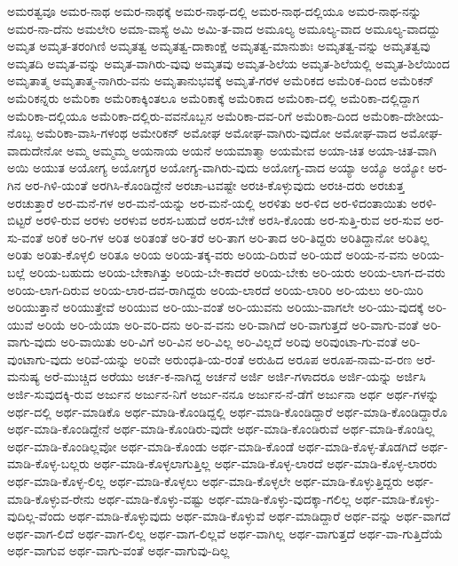 {ಅಮರತ್ವವೂ
ಅಮರ-ನಾಥ
ಅಮರ-ನಾಥಕ್ಕೆ
ಅಮರ-ನಾಥ-ದಲ್ಲಿ
ಅಮರ-ನಾಥ-ದಲ್ಲಿಯೂ
ಅಮರ-ನಾಥ-ನನ್ನು
ಅಮರ-ನಾ-ದೆನು
ಅಮಲೇರಿ
ಅಮಾ-ವಾಸ್ಯೆ
ಅಮಿ
ಅಮಿ-ತ-ವಾದ
ಅಮೂಲ್ಯ
ಅಮೂಲ್ಯ-ವಾದ
ಅಮೂಲ್ಯ-ವಾದದ್ದು
ಅಮೃತ
ಅಮೃತ-ತರಂಗಿಣಿ
ಅಮೃತತ್ವ
ಅಮೃತತ್ವ-ದಾಕಾಂಕ್ಷೆ
ಅಮೃತತ್ವ-ಮಾನುಶುಃ
ಅಮೃತತ್ವ-ವನ್ನು
ಅಮೃತತ್ವವು
ಅಮೃತದಿ
ಅಮೃತ-ವನ್ನು
ಅಮೃತ-ವಾಗಿರು-ವುವು
ಅಮೃತವು
ಅಮೃತ-ಶಿಲೆಯ
ಅಮೃತ-ಶಿಲೆಯಲ್ಲಿ
ಅಮೃತ-ಶಿಲೆಯಿಂದ
ಅಮೃತಾತ್ಮ
ಅಮೃತಾತ್ಮ-ನಾಗಿರು-ವನು
ಅಮೃತಾನುಭವಕ್ಕೆ
ಅಮೃತೆ-ಗರಳ
ಅಮೆರಿಕದ
ಅಮೆರಿಕ-ದಿಂದ
ಅಮೆರಿಕನ್
ಅಮೆರಿಕನ್ನರು
ಅಮೆರಿಕಾ
ಅಮೆರಿಕಾಕ್ಕಿಂತಲೂ
ಅಮೆರಿಕಾಕ್ಕೆ
ಅಮೆರಿಕಾದ
ಅಮೆರಿಕಾ-ದಲ್ಲಿ
ಅಮೆರಿಕಾ-ದಲ್ಲಿದ್ದಾಗ
ಅಮೆರಿಕಾ-ದಲ್ಲಿಯೂ
ಅಮೆರಿಕಾ-ದಲ್ಲಿರು-ವವನೊಬ್ಬನ
ಅಮೆರಿಕಾ-ದವ-ರಿಗೆ
ಅಮೆರಿಕಾ-ದಿಂದ
ಅಮೆರಿಕಾ-ದೇಶೀಯ-ನೊಬ್ಬ
ಅಮೆರಿಕಾ-ವಾಸಿ-ಗಳಂಥ
ಅಮೇರಿಕನ್
ಅಮೋಘ
ಅಮೋಘ-ವಾಗಿರು-ವುದೋ
ಅಮೋಘ-ವಾದ
ಅಮೋಘ-ವಾದುದೇನೋ
ಅಮ್ಮ
ಅಮ್ಮಮ್ಮ
ಅಯನಾಯ
ಅಯನೆ
ಅಯಮಾತ್ಮಾ
ಅಯಮೇವ
ಅಯಾ-ಚಿತ
ಅಯಾ-ಚಿತ-ವಾಗಿ
ಅಯಿ
ಅಯುತ
ಅಯೋಗ್ಯ
ಅಯೋಗ್ಯರ
ಅಯೋಗ್ಯ-ವಾಗಿರು-ವುದು
ಅಯೋಗ್ಯ-ವಾದ
ಅಯ್ಯಾ
ಅಯ್ಯೊ
ಅಯ್ಯೋ
ಅರ-ಗಿನ
ಅರ-ಗಿಳಿ-ಯಂತೆ
ಅರಗಿಸಿ-ಕೊಂಡಿದ್ದೇನೆ
ಅರಚಾ-ಟವಷ್ಟೇ
ಅರಚಿ-ಕೊಳ್ಳುವುದು
ಅರಚಿ-ದರು
ಅರಚುತ್ತ
ಅರಚುತ್ತಾರೆ
ಅರ-ಮನೆ-ಗಳ
ಅರ-ಮನೆ-ಯನ್ನು
ಅರ-ಮನೆ-ಯಲ್ಲಿ
ಅರಳಿತು
ಅರ-ಳಿದ
ಅರ-ಳಿದಂತಾಯಿತು
ಅರಳಿ-ಬಿಟ್ಟರೆ
ಅರಳಿ-ರುವ
ಅರಳು
ಅರಳುವ
ಅರಸ-ಬಹುದೆ
ಅರಸ-ಬೇಕೆ
ಅರಸಿ-ಕೊಂಡು
ಅರ-ಸುತ್ತಿ-ರುವ
ಅರ-ಸುವ
ಅರ-ಸು-ವಂತೆ
ಅರಿಕೆ
ಅರಿ-ಗಳ
ಅರಿತ
ಅರಿತಂತೆ
ಅರಿ-ತರೆ
ಅರಿ-ತಾಗ
ಅರಿ-ತಾದ
ಅರಿ-ತಿದ್ದರು
ಅರಿತಿದ್ದಾನೋ
ಅರಿತಿಲ್ಲ
ಅರಿತು
ಅರಿತು-ಕೊಳ್ಳಲಿ
ಅರಿತೂ
ಅರಿಯ
ಅರಿಯ-ತಕ್ಕ-ವರು
ಅರಿಯ-ದಿರುವೆ
ಅರಿ-ಯದೆ
ಅರಿಯ-ನ-ವನು
ಅರಿಯ-ಬಲ್ಲೆ
ಅರಿಯ-ಬಹುದು
ಅರಿಯ-ಬೇಕಾಗಿತ್ತು
ಅರಿಯ-ಬೇ-ಕಾದರೆ
ಅರಿಯ-ಬೇಕು
ಅರಿ-ಯರು
ಅರಿಯ-ಲಾಗ-ದ-ವರು
ಅರಿಯ-ಲಾಗ-ದಿರುವ
ಅರಿಯ-ಲಾರ-ದವ-ರಾಗಿದ್ದರು
ಅರಿಯ-ಲಾರದೆ
ಅರಿಯ-ಲಾರಿರಿ
ಅರಿ-ಯಲು
ಅರಿ-ಯಿರಿ
ಅರಿಯುತ್ತಾನೆ
ಅರಿಯುತ್ತೇವೆ
ಅರಿಯುವ
ಅರಿ-ಯು-ವಂತೆ
ಅರಿ-ಯುವನು
ಅರಿಯು-ವಾಗಲೇ
ಅರಿ-ಯು-ವುದಕ್ಕೆ
ಅರಿ-ಯುವೆ
ಅರಿಯೆ
ಅರಿ-ಯೆಯಾ
ಅರಿ-ವರಿ-ದನು
ಅರಿ-ವ-ವನು
ಅರಿ-ವಾಗಿದೆ
ಅರಿ-ವಾಗುತ್ತದೆ
ಅರಿ-ವಾಗು-ವಂತೆ
ಅರಿ-ವಾಗು-ವುದು
ಅರಿ-ವಾಯಿತು
ಅರಿ-ವಿಗೆ
ಅರಿ-ವಿನ
ಅರಿ-ವಿಲ್ಲ
ಅರಿ-ವಿಲ್ಲದೆ
ಅರಿವು
ಅರಿವುಂಟಾ-ಗು-ವಂತೆ
ಅರಿ-ವುಂಟಾಗು-ವುದು
ಅರಿವೆ-ಯನ್ನು
ಅರಿವೇ
ಅರುಂಧತಿ-ಯ-ರಂತೆ
ಅರುಹಿದ
ಅರೂಪ
ಅರೂಪ-ನಾಮ-ವ-ರಣ
ಅರೆ-ಮನುಷ್ಯ
ಅರೆ-ಮುಚ್ಚಿದ
ಅರೆಯು
ಅರ್ಚ-ಕ-ನಾಗಿದ್ದ
ಅರ್ಚನೆ
ಅರ್ಜಿ
ಅರ್ಜಿ-ಗಳಾದರೂ
ಅರ್ಜಿ-ಯನ್ನು
ಅರ್ಜಿಸಿ
ಅರ್ಜಿ-ಸುವುದಕ್ಕಿ-ರುವ
ಅರ್ಜುನ
ಅರ್ಜುನ-ನಿಗೆ
ಅರ್ಜು-ನನೂ
ಅರ್ಜುನ-ನೆ-ಡೆಗೆ
ಅರ್ಜುನಾ
ಅರ್ಥ
ಅರ್ಥ-ಗಳನ್ನು
ಅರ್ಥ-ದಲ್ಲಿ
ಅರ್ಥ-ಮಾಡಿಕೊ
ಅರ್ಥ-ಮಾಡಿ-ಕೊಂಡಿದ್ದಲ್ಲಿ
ಅರ್ಥ-ಮಾಡಿ-ಕೊಂಡಿದ್ದಾರೆ
ಅರ್ಥ-ಮಾಡಿ-ಕೊಂಡಿದ್ದಾರೊ
ಅರ್ಥ-ಮಾಡಿ-ಕೊಂಡಿದ್ದೇನೆ
ಅರ್ಥ-ಮಾಡಿ-ಕೊಂಡಿರು-ವುದೇ
ಅರ್ಥ-ಮಾಡಿ-ಕೊಂಡಿರುವೆ
ಅರ್ಥ-ಮಾಡಿ-ಕೊಂಡಿಲ್ಲ
ಅರ್ಥ-ಮಾಡಿ-ಕೊಂಡಿಲ್ಲವೋ
ಅರ್ಥ-ಮಾಡಿ-ಕೊಂಡು
ಅರ್ಥ-ಮಾಡಿ-ಕೊಂಡೆ
ಅರ್ಥ-ಮಾಡಿ-ಕೊಳ್ಳ-ತೊಡಗಿದೆ
ಅರ್ಥ-ಮಾಡಿ-ಕೊಳ್ಳ-ಬಲ್ಲರು
ಅರ್ಥ-ಮಾಡಿ-ಕೊಳ್ಳಲಾಗುತ್ತಿಲ್ಲ
ಅರ್ಥ-ಮಾಡಿ-ಕೊಳ್ಳ-ಲಾರದೆ
ಅರ್ಥ-ಮಾಡಿ-ಕೊಳ್ಳ-ಲಾರರು
ಅರ್ಥ-ಮಾಡಿ-ಕೊಳ್ಳ-ಲಿಲ್ಲ
ಅರ್ಥ-ಮಾಡಿ-ಕೊಳ್ಳಲು
ಅರ್ಥ-ಮಾಡಿ-ಕೊಳ್ಳಲೇ
ಅರ್ಥ-ಮಾಡಿ-ಕೊಳ್ಳುತ್ತಿದ್ದರು
ಅರ್ಥ-ಮಾಡಿ-ಕೊಳ್ಳುವ-ರೇನು
ಅರ್ಥ-ಮಾಡಿ-ಕೊಳ್ಳು-ವಷ್ಟು
ಅರ್ಥ-ಮಾಡಿ-ಕೊಳ್ಳು-ವುದಕ್ಕಾ-ಗಲಿಲ್ಲ
ಅರ್ಥ-ಮಾಡಿ-ಕೊಳ್ಳು-ವುದಿಲ್ಲ-ವೆಂದು
ಅರ್ಥ-ಮಾಡಿ-ಕೊಳ್ಳುವುದು
ಅರ್ಥ-ಮಾಡಿ-ಕೊಳ್ಳುವೆ
ಅರ್ಥ-ಮಾಡಿದ್ದಾರೆ
ಅರ್ಥ-ವನ್ನು
ಅರ್ಥ-ವಾಗದೆ
ಅರ್ಥ-ವಾಗ-ಲಿದೆ
ಅರ್ಥ-ವಾಗ-ಲಿಲ್ಲ
ಅರ್ಥ-ವಾಗ-ಲಿಲ್ಲವೆ
ಅರ್ಥ-ವಾಗಿಲ್ಲ
ಅರ್ಥ-ವಾಗುತ್ತದೆ
ಅರ್ಥ-ವಾ-ಗುತ್ತಿದೆಯೆ
ಅರ್ಥ-ವಾಗುವ
ಅರ್ಥ-ವಾಗು-ವಂತೆ
ಅರ್ಥ-ವಾಗುವು-ದಿಲ್ಲ
}
